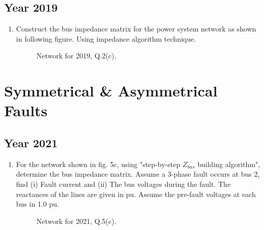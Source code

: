 \documentclass[12pt, a4paper]{article}
\begin{document}
	\subsection{Year 2019}
	\begin{enumerate}[label=\textbf{Q2(c).}, wide, labelindent=0pt]
		\item Construct the bus impedance matrix for the power system network as shown in following figure. Using impedance algorithm technique.
		\begin{figure}[h!]
			\centering
			\caption{Network for 2019, Q.2(c).}
		\end{figure}
	\end{enumerate}
	
	\section{Symmetrical \& Asymmetrical Faults}
	\subsection{Year 2021}
	\begin{enumerate}[label=\textbf{Q5(c).}, wide, labelindent=0pt]
		\item For the network shown in fig. 5c, using "step-by-step $Z_{bus}$ building algorithm", determine the bus impedance matrix. Assume a 3-phase fault occurs at bus 2, find (i) Fault current and (ii) The bus voltages during the fault. The reactances of the lines are given in pu. Assume the pre-fault voltages at each bus in 1.0 pu.
		\begin{figure}[h!]
			\centering
			\caption{Network for 2021, Q.5(c).}
		\end{figure}
	\end{enumerate}
	
\end{document}
